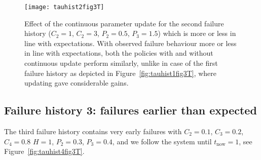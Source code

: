 \documentclass[authoryear]{elsarticle}
\def\tnow{t_\text{now}}
\newcommand{\tausnow}{\tau_*^{(\tnow)}}
\newcommand{\tthresh}{\tau_{\text{thresh}}}
\begin{document}
\begin{figure}
\texttt{[image: tauhist2fig3T]}
\caption{Effect of the continuous parameter update for the second failure history ($C_2 = 1$, $C_2 = 3$, $P_2 = 0.5$, $P_3 = 1.5$)
which is more or less in line with expectations.
With observed failure behaviour more or less in line with expectations,
both the policies with and without continuous update perform similarly,
unlike in case of the first failure history as depicted in Figure~\ref{fig:tauhist1fig3T},
where updating gave considerable gains.}
\label{fig:tauhist2fig3T}
\end{figure}


\subsection{Failure history 3: failures earlier than expected}
\label{sec:ex-3}

%
%
The third failure history contains very early failures
with $C_2 = 0.1$, $C_3 = 0.2$, $C_4 = 0.8$ $H = 1$, $P_2 = 0.3$, $P_3 = 0.4$,
and we follow the system until $\tnow = 1$,
see Figure~\ref{fig:tauhist4fig3T}.
\end{document}
